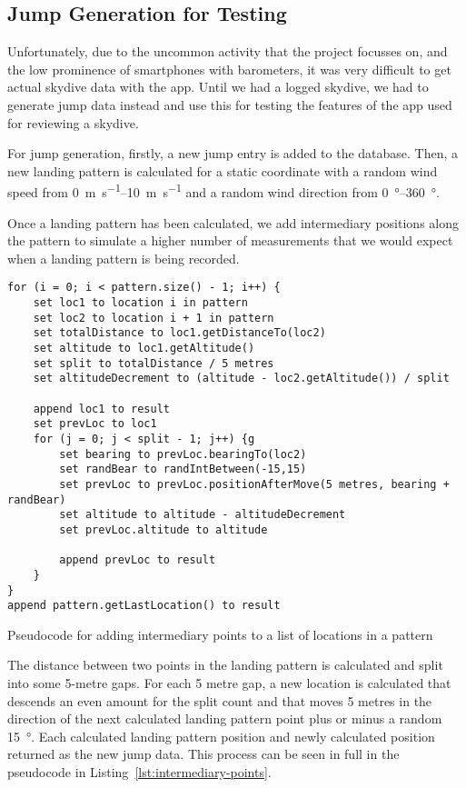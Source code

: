 \subsection{Jump Generation for Testing}
Unfortunately, due to the uncommon activity that the project focusses on, and the low prominence of smartphones with barometers, it was very difficult to get actual skydive data with the app. Until we had a logged skydive, we had to generate jump data instead and use this for testing the features of the app used for reviewing a skydive.

For jump generation, firstly, a new jump entry is added to the database. Then, a new landing pattern is calculated for a static coordinate with a random wind speed from \SIrange{0}{10}{\metre\per\second} and a random wind direction from \SIrange{0}{360}{\degree}.

Once a landing pattern has been calculated, we add intermediary positions along the pattern to simulate a higher number of measurements that we would expect when a landing pattern is being recorded.

\begin{listing}
  \centering
  \begin{lstlisting}[style=code]
for (i = 0; i < pattern.size() - 1; i++) {
    set loc1 to location i in pattern
    set loc2 to location i + 1 in pattern
    set totalDistance to loc1.getDistanceTo(loc2)
    set altitude to loc1.getAltitude()
    set split to totalDistance / 5 metres
    set altitudeDecrement to (altitude - loc2.getAltitude()) / split

    append loc1 to result
    set prevLoc to loc1
    for (j = 0; j < split - 1; j++) {g
        set bearing to prevLoc.bearingTo(loc2)
        set randBear to randIntBetween(-15,15)
        set prevLoc to prevLoc.positionAfterMove(5 metres, bearing + randBear)
        set altitude to altitude - altitudeDecrement
        set prevLoc.altitude to altitude

        append prevLoc to result
    }
}
append pattern.getLastLocation() to result
  \end{lstlisting}
  \caption{Pseudocode for adding intermediary points to a list of locations in a pattern}\label{lst:intermediary-points}
\end{listing}

The distance between two points in the landing pattern is calculated and split into some 5-metre gaps. For each 5 metre gap, a new location is calculated that descends an even amount for the split count and that moves 5 metres in the direction of the next calculated landing pattern point plus or minus a random \SI{15}{\degree}. Each calculated landing pattern position and newly calculated position returned as the new jump data. This process can be seen in full in the pseudocode in Listing~\vref{lst:intermediary-points}.

